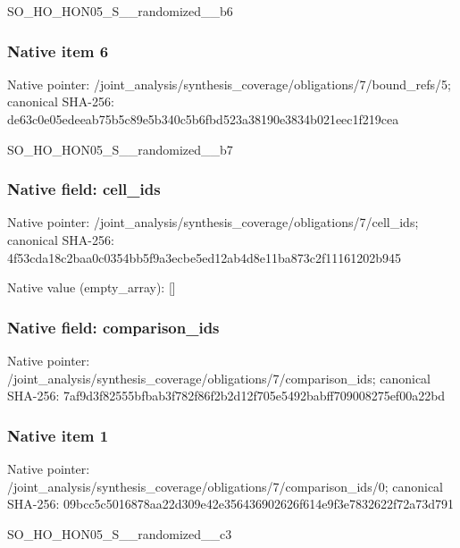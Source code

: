 \documentclass[10pt,a4paper]{article}
\begin{document}
\begingroup\raggedright\sloppy SO\_\allowbreak{}HO\_\allowbreak{}HON05\_\allowbreak{}S\_\allowbreak{}\_\allowbreak{}randomized\_\allowbreak{}\_\allowbreak{}b6\par\endgroup

\subsubsection{Native item 6}
Native pointer: /joint\_\allowbreak{}analysis/synthesis\_\allowbreak{}coverage/obligations/7/bound\_\allowbreak{}refs/5; canonical SHA-256: de63c0e05edeeab75b5c89e5b340c5b6fbd523a38190e3834b021eec1f219cea

\begingroup\raggedright\sloppy SO\_\allowbreak{}HO\_\allowbreak{}HON05\_\allowbreak{}S\_\allowbreak{}\_\allowbreak{}randomized\_\allowbreak{}\_\allowbreak{}b7\par\endgroup

\subsubsection{Native field: cell\_\allowbreak{}ids}
Native pointer: /joint\_\allowbreak{}analysis/synthesis\_\allowbreak{}coverage/obligations/7/cell\_\allowbreak{}ids; canonical SHA-256: 4f53cda18c2baa0c0354bb5f9a3ecbe5ed12ab4d8e11ba873c2f11161202b945

Native value (empty\_\allowbreak{}array): []

\subsubsection{Native field: comparison\_\allowbreak{}ids}
Native pointer: /joint\_\allowbreak{}analysis/synthesis\_\allowbreak{}coverage/obligations/7/comparison\_\allowbreak{}ids; canonical SHA-256: 7af9d3f82555bfbab3f782f86f2b2d12f705e5492babff709008275ef00a22bd

\subsubsection{Native item 1}
Native pointer: /joint\_\allowbreak{}analysis/synthesis\_\allowbreak{}coverage/obligations/7/comparison\_\allowbreak{}ids/0; canonical SHA-256: 09bcc5c5016878aa22d309e42e356436902626f614e9f3e7832622f72a73d791

\begingroup\raggedright\sloppy SO\_\allowbreak{}HO\_\allowbreak{}HON05\_\allowbreak{}S\_\allowbreak{}\_\allowbreak{}randomized\_\allowbreak{}\_\allowbreak{}c3\par\endgroup
\end{document}
